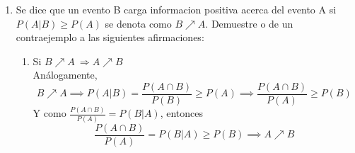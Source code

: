 \documentclass[12pt,a4paper]{report}
\begin{document}
\begin{enumerate}
{\begin{enumerate}[label=\alph*) ]
{\begin{enumerate}
{			\[P(A) = \frac{1}{2}, P(B) = \frac{1}{2}, P(C) = \frac{1}{3}\]
			Y de aquí
			\begin{align*}
				&P(A|B) = \frac{P(A \cap B)}{P(B)} = \frac{\frac{1}{6}}{\frac{1}{2}}
				= \frac{1}{3} \leq \frac{1}{2} = P(A) \implies B \searrow A\\
				&P(A|C) = \frac{P(A \cap C)}{P(C)} = \frac{\frac{1}{6}}{\frac{1}{3}}
				= \frac{1}{2}\leq \frac{1}{2} = P(A) \implies C \searrow A\\
				&P(A|B \cap C) = \frac{P(A \cap C \cap B)}{P(B \cap C)} = \frac{\frac{1}{6}}{\frac{1}{6}}
				= 1 \geq \frac{1}{2} = P(A) \implies B \cap C \nearrow A
			\end{align*}
			Por lo tanto la proposición es falsa
		}
		\end{enumerate}
   }

   \item {
 Se dice que un evento B carga informacion positiva acerca del evento A si
 $P(A|B) \geq P(A)$ se denota como $B \nearrow A$. Demuestre o de un contraejemplo a las siguientes afirmaciones:
 \begin{enumerate}
 \item{
 	Si $B\nearrow A \ \Rightarrow A\nearrow B$\\
	Análogamente,
	\[B \nearrow A \implies P(A|B) = \frac{P(A \cap B)}{P(B)} \geq P(A) \implies \frac{P(A \cap B)}{P(A)} \geq P(B)\]
	Y como $\frac{P(A \cap B)}{P(A)} = P(B|A)$, entonces
	\[\frac{P(A \cap B)}{P(A)} = P(B|A) \geq P(B) \implies A \nearrow B\]
	}\\


\end{enumerate}}
\end{enumerate}}
\end{enumerate}
\end{document}
